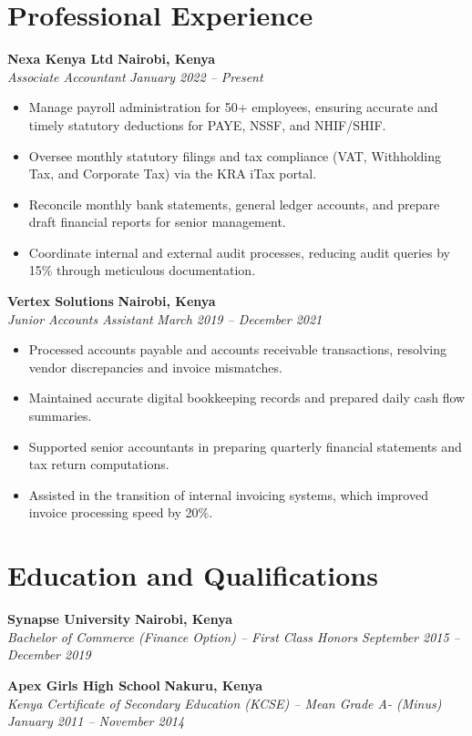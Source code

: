 \documentclass[10pt,a4paper]{article}
\newcommand{\cvitem}[4]{%
  \noindent\textbf{#1} \hfill \textbf{\color{lightText}#2} \\
  \noindent\textit{\color{secondaryColor}#3} \hfill \textit{\small\color{lightText}#4}\par
  \vspace{1pt}%
}
\begin{document}
\section{Professional Experience}

\cvitem{Nexa Kenya Ltd}{Nairobi, Kenya}{Associate Accountant}{January 2022 -- Present}
\begin{itemize}
  \item Manage payroll administration for 50+ employees, ensuring accurate and timely statutory deductions for PAYE, NSSF, and NHIF/SHIF.
  \item Oversee monthly statutory filings and tax compliance (VAT, Withholding Tax, and Corporate Tax) via the KRA iTax portal.
  \item Reconcile monthly bank statements, general ledger accounts, and prepare draft financial reports for senior management.
  \item Coordinate internal and external audit processes, reducing audit queries by 15\% through meticulous documentation.
\end{itemize}

\vspace{4pt}

\cvitem{Vertex Solutions}{Nairobi, Kenya}{Junior Accounts Assistant}{March 2019 -- December 2021}
\begin{itemize}
  \item Processed accounts payable and accounts receivable transactions, resolving vendor discrepancies and invoice mismatches.
  \item Maintained accurate digital bookkeeping records and prepared daily cash flow summaries.
  \item Supported senior accountants in preparing quarterly financial statements and tax return computations.
  \item Assisted in the transition of internal invoicing systems, which improved invoice processing speed by 20\%.
\end{itemize}

\section{Education and Qualifications}

\cvitem{Synapse University}{Nairobi, Kenya}{Bachelor of Commerce (Finance Option) -- First Class Honors}{September 2015 -- December 2019}
\cvitem{Apex Girls High School}{Nakuru, Kenya}{Kenya Certificate of Secondary Education (KCSE) -- Mean Grade A- (Minus)}{January 2011 -- November 2014}
\end{document}

